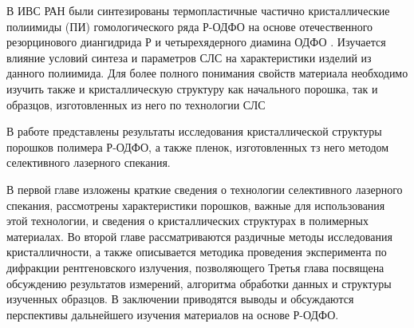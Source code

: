  В ИВС РАН были синтезированы термопластичные частично кристаллические полиимиды (ПИ) гомологического ряда Р-ОДФО на основе отечественного резорцинового диангидрида Р и четырехядерного диамина ОДФО  \cite{yudin-red}. Изучается влияние условий синтеза и параметров СЛС на характеристики изделий из данного полиимида. Для более полного понимания свойств материала необходимо изучить также и кристаллическую структуру как начального порошка, так и образцов, изготовленных из него по технологии СЛС

В работе представлены результаты исследования кристаллической структуры  порошков полимера Р-ОДФО, а также пленок, изготовленных тз него методом селективного лазерного спекания.

В первой главе изложены краткие сведения о технологии селективного лазерного спекания, рассмотрены характеристики порошков, важные для использования этой технологии, и сведения о кристаллических структурах в полимерных материалах.
Во второй главе рассматриваются раздичные методы исследования кристалличности, а также описывается методика проведения эксперимента по дифракции рентгеновского излучения, позволяющего 
Третья глава посвящена обсуждению результатов измерений, алгоритма обработки данных и структуры изученных образцов.
В заключении приводятся выводы и обсуждаются перспективы дальнейшего изучения материалов на основе Р-ОДФО.
